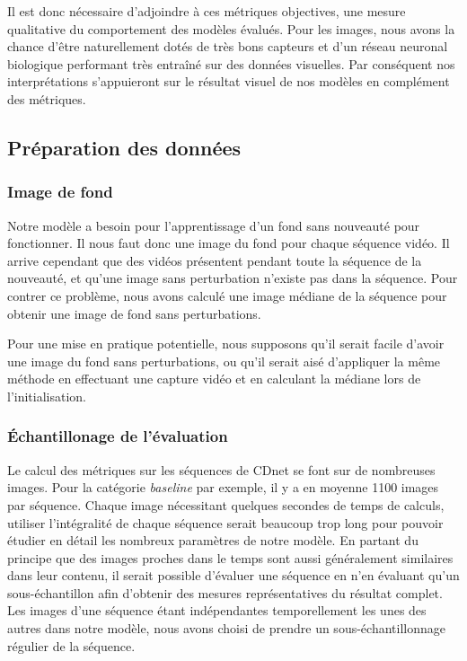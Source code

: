 	Il est donc nécessaire d'adjoindre à ces métriques objectives, une mesure qualitative du comportement des modèles évalués. Pour les images, nous avons la chance d'être naturellement dotés de très bons capteurs et d'un réseau neuronal biologique performant très entraîné sur des données visuelles. Par conséquent nos interprétations s'appuieront sur le résultat visuel de nos modèles en complément des métriques.

	\subsection{Préparation des données}

	\subsubsection{Image de fond}

	Notre modèle a besoin pour l'apprentissage d'un fond sans nouveauté pour fonctionner. Il nous faut donc une image du fond pour chaque séquence vidéo. Il arrive cependant que des vidéos présentent pendant toute la séquence de la nouveauté, et qu'une image sans perturbation n'existe pas dans la séquence. Pour contrer ce problème, nous avons calculé une image médiane de la séquence pour obtenir une image de fond sans perturbations.

	Pour une mise en pratique potentielle, nous supposons qu'il serait facile d'avoir une image du fond sans perturbations, ou qu'il serait aisé d'appliquer la même méthode en effectuant une capture vidéo et en calculant la médiane lors de l'initialisation.
	
	\subsubsection{Échantillonage de l'évaluation}

	Le calcul des métriques sur les séquences de CDnet se font sur de nombreuses images. Pour la catégorie \textit{baseline} par exemple, il y a en moyenne 1100 images par séquence. Chaque image nécessitant quelques secondes de temps de calculs, utiliser l'intégralité de chaque séquence serait beaucoup trop long pour pouvoir étudier en détail les nombreux paramètres de notre modèle. En partant du principe que des images proches dans le temps sont aussi généralement similaires dans leur contenu, il serait possible d'évaluer une séquence en n'en évaluant qu'un sous-échantillon afin d'obtenir des mesures représentatives du résultat complet. Les images d'une séquence étant indépendantes temporellement les unes des autres dans notre modèle, nous avons choisi de prendre un sous-échantillonnage régulier de la séquence.
	
